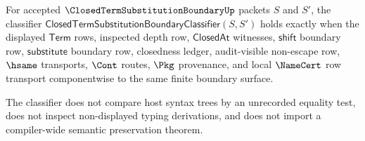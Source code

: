\begin{definition}
\label{def:closed-term-substitution-boundary-classifier}
For accepted $\ClosedTermSubstitutionBoundaryUp$ packets $S$ and $S'$, the classifier $\mathsf{ClosedTermSubstitutionBoundaryClassifier}(S,S')$ holds exactly when the displayed $\mathsf{Term}$ rows, inspected depth row, $\mathsf{ClosedAt}$ witnesses, $\mathsf{shift}$ boundary row, $\mathsf{substitute}$ boundary row, closedness ledger, audit-visible non-escape row, $\hsame$ transports, $\Cont$ routes, $\Pkg$ provenance, and local $\NameCert$ row transport componentwise to the same finite boundary surface.

The classifier does not compare host syntax trees by an unrecorded equality test, does not inspect non-displayed typing derivations, and does not import a compiler-wide semantic preservation theorem.
\end{definition}


